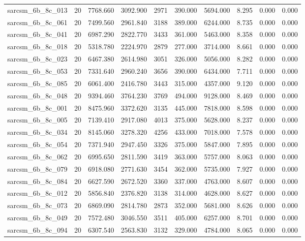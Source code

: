 \begin{tabular}{lrrrrrrrrr}
sarcsm\_6b\_8c\_013 & 20 & 7768.660 & 3092.900 & 2971 & 390.000 & 5694.000 & 8.295 & 0.000 & 0.000 \\
sarcsm\_6b\_8c\_061 & 20 & 7499.560 & 2961.840 & 3188 & 389.000 & 6244.000 & 8.735 & 0.000 & 0.000 \\
sarcsm\_6b\_8c\_041 & 20 & 6987.290 & 2822.770 & 3433 & 361.000 & 5463.000 & 8.358 & 0.000 & 0.000 \\
sarcsm\_6b\_8c\_018 & 20 & 5318.780 & 2224.970 & 2879 & 277.000 & 3714.000 & 8.661 & 0.000 & 0.000 \\
sarcsm\_6b\_8c\_023 & 20 & 6467.380 & 2614.980 & 3051 & 326.000 & 5056.000 & 8.282 & 0.000 & 0.000 \\
sarcsm\_6b\_8c\_053 & 20 & 7331.640 & 2960.240 & 3656 & 390.000 & 6434.000 & 7.711 & 0.000 & 0.000 \\
sarcsm\_6b\_8c\_085 & 20 & 6061.400 & 2416.780 & 3443 & 315.000 & 4357.000 & 9.120 & 0.000 & 0.000 \\
sarcsm\_6b\_8c\_048 & 20 & 9394.460 & 3764.230 & 3769 & 494.000 & 9128.000 & 8.469 & 0.000 & 0.000 \\
sarcsm\_6b\_8c\_001 & 20 & 8475.960 & 3372.620 & 3135 & 445.000 & 7818.000 & 8.598 & 0.000 & 0.000 \\
sarcsm\_6b\_8c\_005 & 20 & 7139.410 & 2917.080 & 4013 & 375.000 & 5628.000 & 8.237 & 0.000 & 0.000 \\
sarcsm\_6b\_8c\_034 & 20 & 8145.060 & 3278.320 & 4256 & 433.000 & 7018.000 & 7.578 & 0.000 & 0.000 \\
sarcsm\_6b\_8c\_054 & 20 & 7371.940 & 2947.450 & 3326 & 375.000 & 5847.000 & 7.895 & 0.000 & 0.000 \\
sarcsm\_6b\_8c\_062 & 20 & 6995.650 & 2811.590 & 3419 & 363.000 & 5757.000 & 8.063 & 0.000 & 0.000 \\
sarcsm\_6b\_8c\_079 & 20 & 6918.080 & 2771.630 & 3454 & 362.000 & 5735.000 & 7.927 & 0.000 & 0.000 \\
sarcsm\_6b\_8c\_084 & 20 & 6627.590 & 2672.520 & 3360 & 337.000 & 4763.000 & 8.607 & 0.000 & 0.000 \\
sarcsm\_6b\_8c\_012 & 20 & 5856.840 & 2376.820 & 3138 & 314.000 & 4628.000 & 8.627 & 0.000 & 0.000 \\
sarcsm\_6b\_8c\_073 & 20 & 6869.090 & 2814.780 & 2873 & 352.000 & 5681.000 & 8.626 & 0.000 & 0.000 \\
sarcsm\_6b\_8c\_049 & 20 & 7572.480 & 3046.550 & 3511 & 405.000 & 6257.000 & 8.701 & 0.000 & 0.000 \\
sarcsm\_6b\_8c\_094 & 20 & 6307.540 & 2563.830 & 3132 & 329.000 & 4784.000 & 8.065 & 0.000 & 0.000 \\

\end{tabular}
